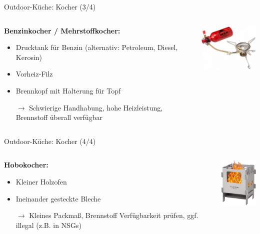 \documentclass[aspectratio=169]{beamer}
\newcommand{\sarrow}{\small$\rightarrow$}
\begin{document}
			\begin{frame}{Outdoor-Küche: Kocher (3/4)}
				\begin{columns}[c]
					\begin{column}{0.62\textwidth}
						\textbf{Benzinkocher / Mehrstoffkocher:}
						\begin{itemize}
							\item Drucktank für Benzin (alternativ: Petroleum, Diesel, Kerosin)
							\item Vorheiz-Filz
							\item Brennkopf mit Halterung für Topf
							\item[\sarrow] Schwierige Handhabung, hohe Heizleistung, Brennstoff überall verfügbar
						\end{itemize}
					\end{column}
					\begin{column}{0.36\textwidth}
						\includegraphics[width=3.85cm]{images/kocher-benzin.png}
					\end{column}
				\end{columns}
			\end{frame}
		
			\begin{frame}{Outdoor-Küche: Kocher (4/4)}
				\begin{columns}[c]
					\begin{column}{0.69\textwidth}
						\textbf{Hobokocher:}
						\begin{itemize}
							\item Kleiner Holzofen
							\item Ineinander gesteckte Bleche
							\item[\sarrow] Kleines Packmaß, Brennstoff Verfügbarkeit prüfen, ggf. illegal (z.B. in NSGs) 
						\end{itemize}
					\end{column}
					\begin{column}{0.29\textwidth}
						\includegraphics[width=2.35cm]{images/kocher-hobo.png}
					\end{column}
				\end{columns}
			\end{frame}
			
\end{document}

